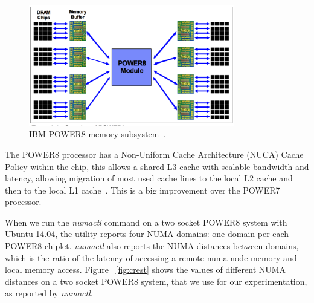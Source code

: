 \begin{figure}[h!]
  \centering
  \includegraphics[height=0.4\textwidth, width=0.8\textwidth]{./Images/P8_memory.pdf}
       \caption{IBM POWER8 memory subsystem~\cite{IBM_P8}.}
       \label{fig:p8_2}
\end{figure}
The POWER8 processor has a Non-Uniform Cache Architecture (NUCA) Cache Policy within the chip, this allows a shared L3 cache with scalable bandwidth and latency, allowing migration of most used cache lines to the local L2 cache and then to the local L1 cache~\cite{IBM_P8}. This is a big improvement over the POWER7 processor.  

When we run the \textit{numactl} command on a two socket POWER8 system with Ubuntu 14.04, the utility reports four NUMA domains: one domain per each POWER8 chiplet. \textit{numactl}  also reports the NUMA distances between domains, which is the ratio of the latency of accessing  a remote numa node memory and local memory access. Figure ~\ref{fig:crest} shows the values of different NUMA distances on a two socket POWER8 system, that we use for our experimentation, as reported by \textit{numactl}.

